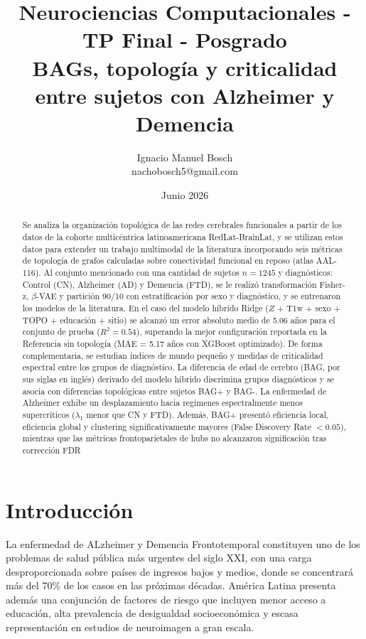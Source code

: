\documentclass[12pt,a4paper]{article}
\title{
  \large Neurociencias Computacionales - TP Final - Posgrado \\[0.5em]
  \LARGE BAGs, topología y criticalidad entre sujetos con Alzheimer y Demencia \\
  
}
\author{
  Ignacio Manuel Bosch \\
  \small nachobosch5@gmail.com
}
\date{Junio 2026}
\begin{document}
\maketitle
\thispagestyle{empty}

\begin{abstract}
Se analiza la organización topológica de las redes cerebrales funcionales a partir de los datos de la cohorte multicéntrica latinoamericana RedLat-BrainLat, y se utilizan estos datos para extender un trabajo multimodal de la literatura\cite{bazan2026} incorporando seis métricas de topología de grafos calculadas sobre conectividad funcional en reposo (atlas AAL-116). Al conjunto mencionado con una cantidad de sujetos $n = 1245$ y diagnósticos: Control (CN), Alzheimer (AD) y Demencia (FTD), se le realizó transformación Fisher-z, $\beta$-VAE y partición 90/10 con estratificación por sexo y diagnóstico, y se entrenaron los modelos de la literatura. En el caso del modelo híbrido Ridge ($Z$ + T1w + sexo + TOPO + educación + sitio) se alcanzó un error absoluto medio de 5.06 años para el conjunto de prueba ($R^2 = 0.54$), superando la mejor configuración reportada en la Referencia sin topología (MAE = 5.17 años con XGBoost optimizado). De forma complementaria, se estudian índices de mundo pequeño y medidas de criticalidad espectral entre los grupos de diagnóstico. La diferencia de edad de cerebro (BAG, por sus siglas en inglés) derivado del modelo híbrido discrimina grupos diagnósticos y se asocia con diferencias topológicas entre sujetos BAG+ y BAG-. La enfermedad de Alzheimer exhibe un desplazamiento hacia regímenes espectralmente menos supercríticos ($\lambda_1$ menor que CN y FTD). Además, BAG+ presentó eficiencia local, eficiencia global y clustering significativamente mayores (False Discovery Rate $< 0.05$), mientras que las métricas frontoparietales de hubs no alcanzaron significación tras corrección FDR
\end{abstract}



\section{Introducción}

La enfermedad de ALzheimer y Demencia Frontotemporal constituyen uno de los problemas de salud pública más urgentes del siglo XXI, con una carga desproporcionada sobre países de ingresos bajos y medios, donde se concentrará más del 70\% de los casos en las próximas décadas. América Latina presenta además una conjunción de factores de riesgo que incluyen menor acceso a educación, alta prevalencia de desigualdad socioeconómica y escasa representación en estudios de neuroimagen a gran escala\cite{moguilner2024}.
\end{document}
